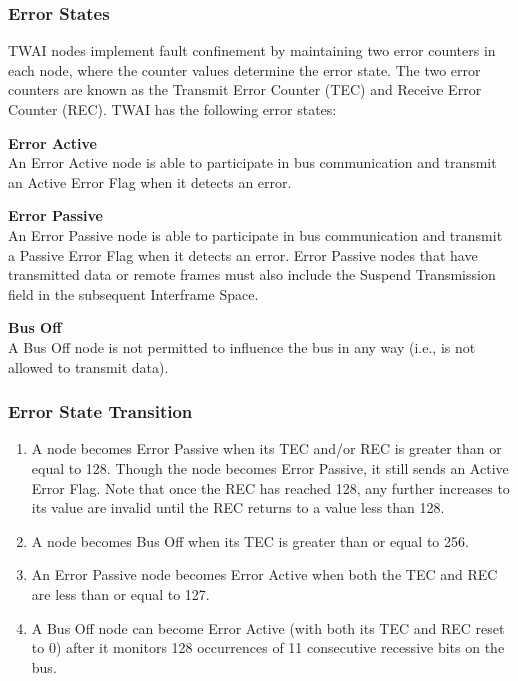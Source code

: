 \documentclass[main\_\_EN.tex]{subfiles}
\begin{document}
\subsubsection{Error States}

TWAI nodes implement fault confinement by maintaining two error counters in each node, where the counter values determine the error state. The two error counters are known as the Transmit Error Counter (TEC) and Receive Error Counter (REC). TWAI has the following error states:

{\bfseries Error Active}\label{table_item:active_err}\\
An Error Active node is able to participate in bus communication and transmit an Active Error Flag when it detects an error.

{\bfseries Error Passive}\label{table_item:passive_err}\\
An Error Passive node is able to participate in bus communication and transmit a Passive Error Flag when it detects an error. Error Passive nodes that have transmitted data or remote frames must also include the Suspend Transmission field in the subsequent Interframe Space.

{\bfseries Bus Off}\\
A Bus Off node is not permitted to influence the bus in any way (i.e., is not allowed to transmit data).

\subsubsection{Error State Transition}

\begin{enumerate}
    \item A node becomes Error Passive when its TEC and/or REC is greater than or equal to 128. Though the node becomes Error Passive, it still sends an Active Error Flag. Note that once the REC has reached 128, any further increases to its value are invalid until the REC returns to a value less than 128.
    \item A node becomes Bus Off when its TEC is greater than or equal to 256.
    \item An Error Passive node becomes Error Active when both the TEC and REC are less than or equal to 127.
    \item A Bus Off node can become Error Active (with both its TEC and REC reset to 0) after it monitors 128 occurrences of 11 consecutive recessive bits on the bus.
\end{enumerate}
\end{document}
